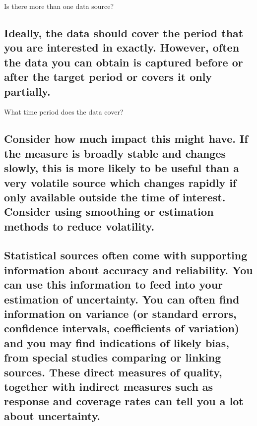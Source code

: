 \documentclass[]{book}
\begin{document}
 Is there more than one data source?

\subsection{Ideally, the data should cover the period that you are
interested in exactly. However, often the data you can obtain is
captured before or after the target period or covers it only
partially.}\label{ideally-the-data-should-cover-the-period-that-you-are-interested-in-exactly.-however-often-the-data-you-can-obtain-is-captured-before-or-after-the-target-period-or-covers-it-only-partially.}

 What time period does the data cover?

\subsection{Consider how much impact this might have. If the measure is
broadly stable and changes slowly, this is more likely to be useful than
a very volatile source which changes rapidly if only available outside
the time of interest. Consider using smoothing or estimation methods to
reduce
volatility.}\label{consider-how-much-impact-this-might-have.-if-the-measure-is-broadly-stable-and-changes-slowly-this-is-more-likely-to-be-useful-than-a-very-volatile-source-which-changes-rapidly-if-only-available-outside-the-time-of-interest.-consider-using-smoothing-or-estimation-methods-to-reduce-volatility.}

\subsection{Statistical sources often come with supporting information
about accuracy and reliability. You can use this information to feed
into your estimation of uncertainty. You can often find information on
variance (or standard errors, confidence intervals, coefficients of
variation) and you may find indications of likely bias, from special
studies comparing or linking sources. These direct measures of quality,
together with indirect measures such as response and coverage rates can
tell you a lot about
uncertainty.}\label{statistical-sources-often-come-with-supporting-information-about-accuracy-and-reliability.-you-can-use-this-information-to-feed-into-your-estimation-of-uncertainty.-you-can-often-find-information-on-variance-or-standard-errors-confidence-intervals-coefficients-of-variation-and-you-may-find-indications-of-likely-bias-from-special-studies-comparing-or-linking-sources.-these-direct-measures-of-quality-together-with-indirect-measures-such-as-response-and-coverage-rates-can-tell-you-a-lot-about-uncertainty.}
\end{document}
